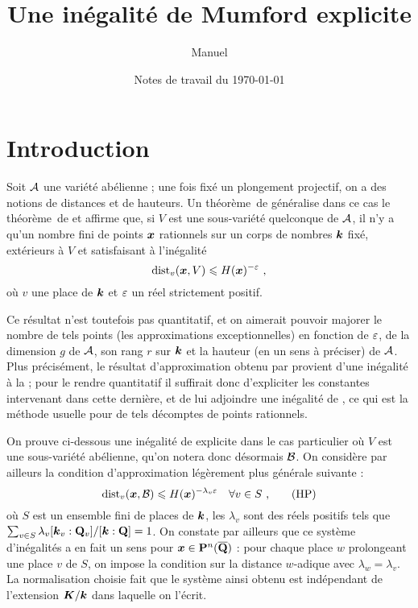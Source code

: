 

\usepackage[colorlinks=true, urlcolor=black, linkcolor=black, citecolor=black,
	 pdftex, bookmarks=true, bookmarksnumbered=true]{hyperref}

\newtheorem{thm}{Théorème} \newtheorem{prop}[thm]{Proposition} \newtheorem{lem}[thm]{Lemme} \newtheorem{coro}[thm]{Corollaire} \newtheorem{fait}[thm]{Fait}
\theoremstyle{remark}
\newtheorem*{rem}{Remarque}

\author{Manuel }
\title{Une inégalité de Mumford explicite}
\date{Notes de travail du \today}


\maketitle

\section*{Introduction}

Soit $\mathcal A$ une variété abélienne ; une fois fixé un plongement projectif, on a
des notions de distances et de hauteurs. Un théorème~de 
généralise dans ce cas le théorème~de  et affirme que, si $V$ est
une sous-variété quelconque de $\mathcal A$, il n'y a qu'un nombre fini de points
$\boldsymbol{x}$ rationnels sur un corps de nombres $\boldsymbol{k}$ fixé, extérieurs à $V$ et
satisfaisant à l'inégalité
\[
 \mathrm{dist}_v(\boldsymbol{x}, V) \leqslant H(\boldsymbol{x})^{-\varepsilon} \text{ ,}
\]
où $v$ une place de $\boldsymbol{k}$ et $\varepsilon$ un réel strictement positif.

Ce résultat n'est toutefois pas quantitatif, et on aimerait pouvoir majorer le
nombre de tels points (les approximations exceptionnelles) en fonction de
$\varepsilon$, de la dimension $g$ de $\mathcal A$, son rang $r$ sur $\boldsymbol{k}$ et la hauteur (en
un sens à préciser) de $\mathcal A$. Plus précisément, le résultat d'approximation
obtenu par  provient d'une inégalité à la  ; pour le
rendre quantitatif il suffirait donc d'expliciter les constantes intervenant
dans cette dernière, et de lui adjoindre une inégalité de , ce
qui est la méthode usuelle pour de tels décomptes de points rationnels.

On prouve ci-dessous une inégalité de  explicite dans le cas
particulier où $V$ est une sous-variété abélienne, qu'on notera donc désormais
$\mathcal B$. On considère par ailleurs la condition d'approximation légèrement plus
générale suivante :
\[
 \mathrm{dist}_v(\boldsymbol{x}, \mathcal B) \leqslant H(\boldsymbol{x})^{-\lambda_v\varepsilon} \quad \forall v \in S \text{ ,} \tag{HP} \label{HP}
\]
où $S$ est un ensemble fini de places de $\boldsymbol{k}$, les $\lambda_v$ sont des
réels positifs tels que $\sum_{v \in S} \lambda_v [\boldsymbol{k}_v : \mathbf{Q}_v]/[\boldsymbol{k} : \mathbf{Q}]
= 1$. On constate par ailleurs que ce système d'inégalités a en fait un sens
pour $\boldsymbol{x} \in \mathbf{P}^n(\overline{\mathbf{Q}})$ : pour chaque place $w$ prolongeant une place
$v$ de $S$, on impose la condition sur la distance $w$-adique avec $\lambda_w
= \lambda_v$. La normalisation choisie fait que le système ainsi obtenu est
indépendant de l'extension $\boldsymbol{K}/\boldsymbol{k}$ dans laquelle on l'écrit.

